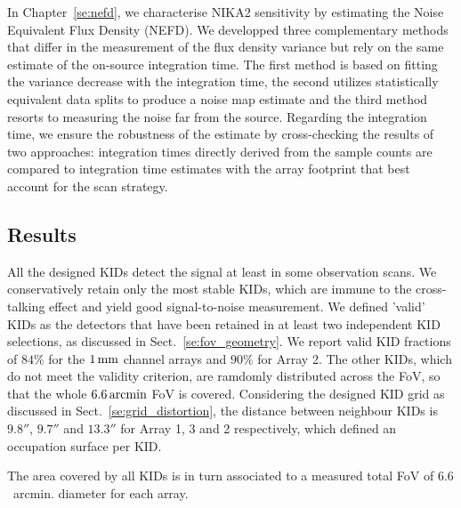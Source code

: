 In Chapter~\ref{se:nefd}, we characterise NIKA2 sensitivity by
estimating the Noise Equivalent Flux Density (NEFD). We developped
three complementary methods that differ in the measurement of the flux
density variance but rely on the
same estimate of the on-source integration time. The first method is
based on fitting the variance decrease with the integration time, the
second utilizes statistically equivalent data splits to produce a
noise map estimate and the third method resorts to measuring the noise
far from the source. Regarding the integration time, we ensure the
robustness of the estimate by cross-checking the results of two
approaches: integration times directly derived from the sample counts
are compared to integration time estimates with the array footprint
that best account for the scan strategy.  


\subsection*{Results}

All the designed KIDs detect the signal at least in some observation
scans. We conservatively retain only the most stable KIDs, which are
immune to the cross-talking effect and yield good signal-to-noise
measurement. We defined 'valid' KIDs as the detectors that have been
retained in at least two independent KID selections, as discussed in
Sect.~\ref{se:fov_geometry}. We report valid KID fractions of $84\%$
for the $1\,\rm{mm}$ channel arrays and $90\%$ for Array 2. The other
KIDs, which do not meet the validity criterion, are ramdomly
distributed across the FoV, so that the whole $6.6\,\rm{arcmin}$ FoV is
covered. Considering the designed KID grid as discussed in
Sect.~\ref{se:grid_distortion}, the distance between
neighbour KIDs is $9.8''$, $9.7''$ and $13.3''$ for Array 1, 3 and 2
respectively, which defined an occupation surface per KID.

The area covered by all KIDs is in turn associated to a measured total FoV of
$6.6$~arcmin. diameter for each array.

